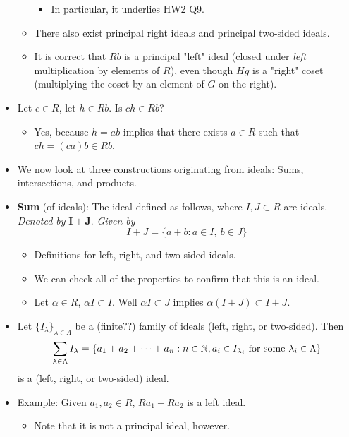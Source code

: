 \documentclass[../notes.tex]{subfiles}
\begin{document}
\begin{itemize}
\begin{itemize}
\begin{itemize}
            \item In particular, it underlies HW2 Q9.
        \end{itemize}
        \item There also exist principal right ideals and principal two-sided ideals.
        \item It is correct that $Rb$ is a principal "left" ideal (closed under \emph{left} multiplication by elements of $R$), even though $Hg$ is a "right" coset (multiplying the coset by an element of $G$ on the right).
    \end{itemize}
    \item Let $c\in R$, let $h\in Rb$. Is $ch\in Rb$?
    \begin{itemize}
        \item Yes, because $h=ab$ implies that there exists $a\in R$ such that $ch=(ca)b\in Rb$.
    \end{itemize}
    \item We now look at three constructions originating from ideals: Sums, intersections, and products.
    \item \textbf{Sum} (of ideals): The ideal defined as follows, where $I,J\subset R$ are ideals. \emph{Denoted by} $\bm{I+J}$. \emph{Given by}
    \begin{equation*}
        I+J = \{a+b:a\in I,\ b\in J\}
    \end{equation*}
    \begin{itemize}
        \item Definitions for left, right, and two-sided ideals.
        \item We can check all of the properties to confirm that this is an ideal.
        \item Let $\alpha\in R$, $\alpha I\subset I$.  Well $\alpha I\subset J$ implies $\alpha(I+J)\subset I+J$.
    \end{itemize}
    \item Let $\{I_\lambda\}_{\lambda\in\Lambda}$ be a (finite??) family of ideals (left, right, or two-sided). Then
    \begin{equation*}
        \sum_{\lambda\in\Lambda}I_\lambda = \{a_1+a_2+\cdots+a_n:n\in\mathbb{N},a_i\in I_{\lambda_i}\text{ for some }\lambda_i\in\Lambda\}
    \end{equation*}
    is a (left, right, or two-sided) ideal.
    \item Example: Given $a_1,a_2\in R$, $Ra_1+Ra_2$ is a left ideal.
    \begin{itemize}
        \item Note that it is not a principal ideal, however.

\end{itemize}
\end{itemize}
\end{document}
